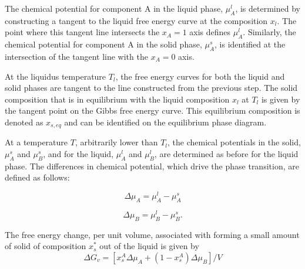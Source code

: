 The chemical potential for component A in the liquid phase, \(\mu_A^l\), is determined by constructing a tangent to the liquid 
free energy curve at the composition \(x_l\). The point where this tangent line intersects the \(x_A = 1\) axis defines \(\mu_A^l\). 
Similarly, the chemical potential for component A in the solid phase, \(\mu_A^s\), is identified at the intersection of the tangent line with the \(x_A = 0\) axis.

At the liquidus temperature \(T_l\), the free energy curves for both the liquid and solid phases are tangent to the line constructed 
from the previous step. The solid composition that is in equilibrium with the liquid composition \(x_l\) at \(T_l\) is given by the 
tangent point on the Gibbs free energy curve. This equilibrium composition is denoted as \(x_{s,eq}\) and can be identified on the equilibrium phase diagram.

At a temperature \(T\), arbitrarily lower than \(T_l\), the chemical potentials in the solid, \(\mu_A^s\) and \(\mu_B^s\), and for 
the liquid, \(\mu_A^l\) and \(\mu_B^l\), are determined as before for the liquid phase. The differences in chemical potential, which 
drive the phase transition, are defined as follows:

\begin{equation}
\Delta\mu_A = \mu_A^l - \mu_A^s \label{eq:delta_mu_A}
\end{equation} 

\begin{equation}
\Delta\mu_B = \mu_B^l - \mu_B^s. \label{eq:delta_mu_B}
\end{equation} 

The free energy change, per unit volume, associated with forming a small amount of solid of composition \(x_{s}^\ast\) out of the liquid is given by
\begin{equation}
\Delta G_v = [x_s^A \Delta\mu_A + (1 - x_s^A) \Delta\mu_B]/V \label{eq:delta_G_v}
\end{equation} 

